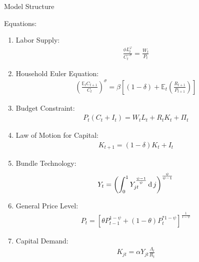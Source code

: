 \documentclass[
presentation.tex
]{subfiles}
\begin{document}

\begin{frame}[allowframebreaks]{Model Structure}

	{\singlespacing

Equations:

\begin{enumerate}
	\item Labor Supply:
	\begin{align}
		\frac{\phi L_t^{\varphi}}{C_t^{-\sigma}} = \frac{W_t}{P_t}
	\end{align}
	
	\item Household Euler Equation:
	\begin{align}
		\left( \frac{\mathbb{E}_t C_{t+1}}{C_t} \right)^\sigma = \beta \left[ (1-\delta) + \mathbb{E}_t \left(\frac{R_{t+1}}{P_{t+1}}\right) \right]
	\end{align}
	
	\item Budget Constraint: 
	\begin{align}
		P_t (C_t + I_t) = W_t L_t + R_t K_t + \Pi_t
	\end{align}
	
	\item Law of Motion for Capital:
	\begin{align}
		K_{t+1} = (1-\delta)K_t + I_t
	\end{align}
	
	\item Bundle Technology:
	\begin{align}
		Y_t = \left( \int_{0}^{1} Y_{jt}^{\frac{\psi-1}{\psi}} \operatorname{d} j \right)^{\frac{\psi}{\psi-1}}
	\end{align}
	
	\item General Price Level:
	\begin{align}
		P_t = \left[ \theta P_{t-1}^{1-\psi} + (1-\theta) P_t^{\ast 1-\psi} \right]^\frac{1}{1-\psi}
	\end{align}
	
	\item Capital Demand:
	\begin{align}
		K_{jt} = \alpha Y_{jt} \frac{\Lambda_t}{R_t}
	\end{align}
	

\end{enumerate}}
\end{frame}
\end{document}
